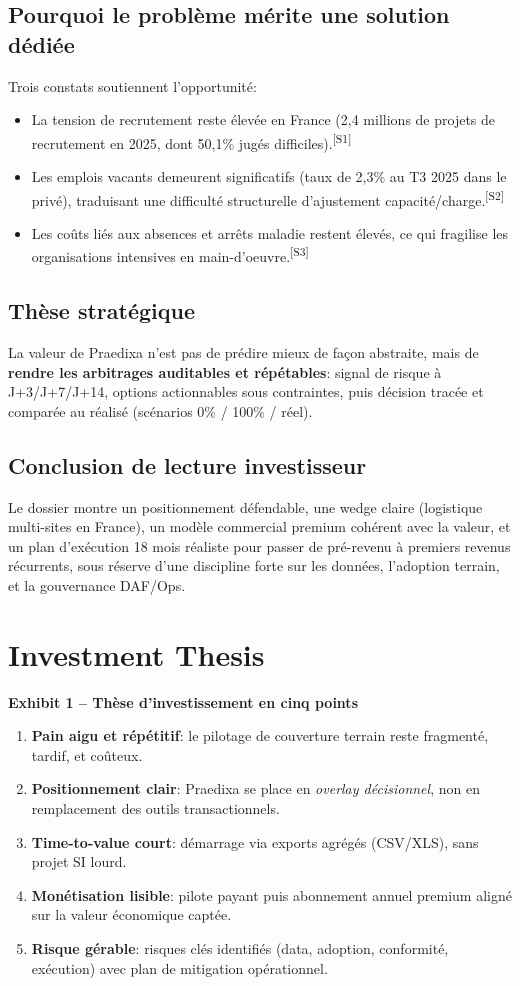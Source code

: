 \documentclass[11pt,a4paper]{article}
\newcommand{\srcref}[1]{\textsuperscript{\textcolor{PraedixaBlue}{[#1]}}}
\newcommand{\exhibit}[1]{\vspace{2mm}\noindent\colorbox{PraedixaLight}{\parbox{\dimexpr\linewidth-2\fboxsep\relax}{\textbf{#1}}}\vspace{1mm}}
\begin{document}
\subsection{Pourquoi le problème mérite une solution dédiée}
Trois constats soutiennent l'opportunité:
\begin{itemize}
  \item La tension de recrutement reste élevée en France (2,4 millions de projets de recrutement en 2025, dont 50,1\% jugés difficiles).\srcref{S1}
  \item Les emplois vacants demeurent significatifs (taux de 2,3\% au T3 2025 dans le privé), traduisant une difficulté structurelle d'ajustement capacité/charge.\srcref{S2}
  \item Les coûts liés aux absences et arrêts maladie restent élevés, ce qui fragilise les organisations intensives en main-d'oeuvre.\srcref{S3}
\end{itemize}

\subsection{Thèse stratégique}
La valeur de Praedixa n'est pas de \og prédire mieux \fg{} de façon abstraite, mais de \textbf{rendre les arbitrages auditables et répétables}: signal de risque à J+3/J+7/J+14, options actionnables sous contraintes, puis décision tracée et comparée au réalisé (scénarios 0\% / 100\% / réel).

\subsection{Conclusion de lecture investisseur}
Le dossier montre un positionnement défendable, une wedge claire (logistique multi-sites en France), un modèle commercial premium cohérent avec la valeur, et un plan d'exécution 18 mois réaliste pour passer de pré-revenu à premiers revenus récurrents, sous réserve d'une discipline forte sur les données, l'adoption terrain, et la gouvernance DAF/Ops.

\section{Investment Thesis}
\exhibit{Exhibit 1 -- Thèse d'investissement en cinq points}
\begin{enumerate}
  \item \textbf{Pain aigu et répétitif}: le pilotage de couverture terrain reste fragmenté, tardif, et coûteux.
  \item \textbf{Positionnement clair}: Praedixa se place en \textit{overlay décisionnel}, non en remplacement des outils transactionnels.
  \item \textbf{Time-to-value court}: démarrage via exports agrégés (CSV/XLS), sans projet SI lourd.
  \item \textbf{Monétisation lisible}: pilote payant puis abonnement annuel premium aligné sur la valeur économique captée.
  \item \textbf{Risque gérable}: risques clés identifiés (data, adoption, conformité, exécution) avec plan de mitigation opérationnel.
\end{enumerate}
\end{document}
